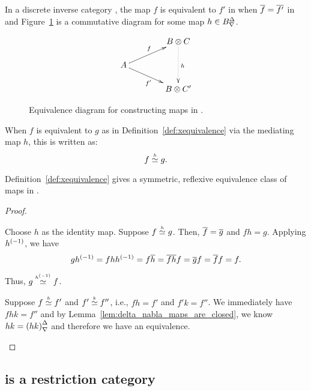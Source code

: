 \begin{definition}\label{def:xequivalence}
  In a discrete inverse category \X, the map $f$ is equivalent to $f'$ in \X when
  $\overline{f} = \overline{f'}$ in \X and Figure~\ref{fig:xt_map_equivalence_diagram} is a commutative diagram for some
  map $h\in{B}^{\Delta}_{\nabla}$.
\begin{figure}[H]
  \[
    \xymatrix @C=40pt @R=15pt{
      & B \* C  \ar@{.>}[dd]^{h} \\
      A \ar[ur]^f \ar[dr]_{f'}\\
      & B\* C'
    }
  \]
\caption{Equivalence diagram for constructing maps in \Xt.}
\label{fig:xt_map_equivalence_diagram}
\end{figure}
\end{definition}

\begin{notation}\label{notn:xequivalence}
  When $f$ is equivalent to $g$ as in Definition~\ref{def:xequivalence} via the mediating map $h$,
  this is written as:
  \[
    f\overset{\scriptscriptstyle h}{\simeq}g.
  \]
\end{notation}

\begin{lemma}\label{lem:mediating_map_equivalence_is_symmetric_reflexive_and_transitive}
  Definition~\ref{def:xequivalence} gives a symmetric, reflexive equivalence class of maps in \X.
\end{lemma}
\begin{proof}
  \prepprooflist
  \begin{description}
     Choose $h$ as the identity map.
     Suppose $f\overset{\scriptscriptstyle h}{\simeq}g$. Then, $\overline{f} = \overline{g}$ and $f h = g$.
      Applying ${h}^{(-1)}$, we have
      \[
        g {h}^{(-1)} = f h {h}^{(-1)} = f \overline{h} = \overline{f h} f
        = \overline{g} f = \overline{f} f = f.
      \]

      Thus, $g\overset{\scriptscriptstyle {h}^{(-1)}}{\simeq} f$.

     Suppose $f\overset{\scriptscriptstyle h}{\simeq} f'$ and $f' \overset{\scriptscriptstyle k}{\simeq} f''$, i.e., $f h = f'$ and
    $f' k = f''$. We immediately have $f h k = f''$ and by
    Lemma~\ref{lem:delta_nabla_maps_are_closed}, we know $h k = {(h k)}^{\Delta}_{\nabla}$ and therefore we have
    an equivalence.
  \end{description}
\end{proof}


\subsection{\hypXt is a restriction category} %
\label{subsec:the_restriction_category_hypxt}


